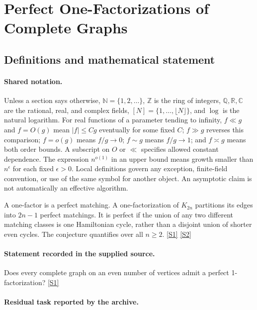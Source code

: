 \documentclass[11pt,a4paper]{article}
\newcommand{\N}{\mathbb{N}}
\newcommand{\Z}{\mathbb{Z}}
\newcommand{\Q}{\mathbb{Q}}
\newcommand{\R}{\mathbb{R}}
\newcommand{\C}{\mathbb{C}}
\newcommand{\sref}[2]{\hyperlink{source:#1:#2}{[S#2]}}
\begin{document}
\section{Perfect One-Factorizations of Complete Graphs}\label{statement}


\subsection{Definitions and mathematical statement}

\paragraph{Shared notation.}Unless a section says otherwise, $\N=\{1,2,\ldots\}$,
$\Z$ is the ring of integers, $\Q,\R,\C$ are the rational, real, and complex
fields, $[N]=\{1,\ldots,\lfloor N\rfloor\}$, and $\log$ is the natural
logarithm. For real functions of a parameter tending to infinity,
$f\ll g$ and $f=O(g)$ mean $|f|\leq Cg$ eventually for some fixed $C$;
$f\gg g$ reverses this comparison; $f=o(g)$ means $f/g\to0$;
$f\sim g$ means $f/g\to1$; and $f\asymp g$ means both order bounds.
A subscript on $O$ or $\ll$ specifies allowed constant dependence.
The expression $n^{o(1)}$ in an upper bound means growth smaller than
$n^\epsilon$ for each fixed $\epsilon>0$. Local definitions govern any
exception, finite-field convention, or use of the same symbol for another
object. An asymptotic claim is not automatically an effective algorithm.



A one-factor is a perfect matching. A one-factorization of $K_{2n}$ partitions its edges into $2n-1$ perfect matchings. It is perfect if the union of any two different matching classes is one Hamiltonian cycle, rather than a disjoint union of shorter even cycles. The conjecture quantifies over all $n\geq2$. \sref{statement}{1} \sref{statement}{2}

\paragraph{Statement recorded in the supplied source.}
Does every complete graph on an even number of vertices admit a perfect 1-factorization? \sref{statement}{1}

\paragraph{Residual task reported by the archive.}
\end{document}
